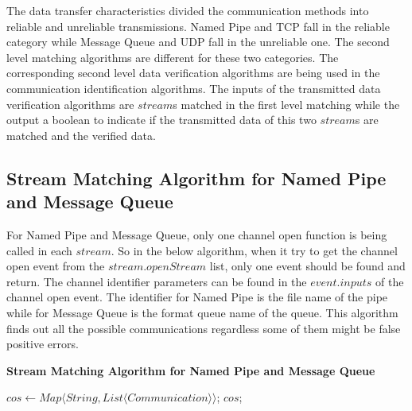 The data transfer characteristics divided the communication methods into reliable and unreliable transmissions. Named Pipe and TCP fall in the reliable category while Message Queue and UDP fall in the unreliable one. The second level matching algorithms are different for these two categories. The corresponding second level data verification algorithms are being used in the communication identification algorithms. The inputs of the transmitted data verification algorithms are $stream$s matched in the first level matching while the output a boolean to indicate if the transmitted data of this two $stream$s are matched and the verified data.

\subsection{Stream Matching Algorithm for Named Pipe and Message Queue}
For Named Pipe and Message Queue, only one channel open function is being called in each $stream$. So in the below algorithm, when it try to get the channel open event from the $stream.openStream$ list, only one event should be found and return. The channel identifier parameters can be found in the $event.inputs$ of the channel open event. The identifier for Named Pipe is the file name of the pipe while for Message Queue is the format queue name of the queue. This algorithm finds out all the possible communications regardless some of them might be false positive errors. 

\begin{algorithm}[H]
\DontPrintSemicolon
\caption{{\bf Stream Matching Algorithm for Named Pipe and Message Queue} \label{channelAlg1}}
$cos \leftarrow Map \langle String, List \langle Communication \rangle \rangle$;\; 
\KwRet $cos$;\;
\end{algorithm} 


